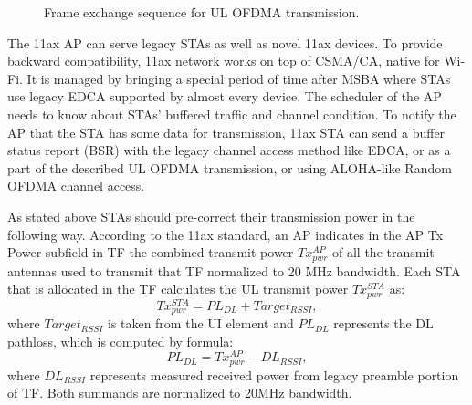 \begin{figure}[t]
{}
	\caption{\label{fig:transmission} Frame exchange sequence for UL OFDMA transmission.}
	\vspace{-0.5em}
\end{figure}

The 11ax AP can serve legacy STAs as well as novel 11ax devices. 
To provide backward compatibility, 11ax network works on top of CSMA/CA, native for Wi-Fi.
It is managed by bringing a special period of time after MSBA where STAs use legacy EDCA supported by almost every device. 
The scheduler of the AP needs to know about STAs' buffered traffic and channel condition.
To notify the AP that the STA has some data for transmission, 11ax STA can send a buffer status report (BSR) with the legacy channel access method like EDCA, or as a part of the described UL OFDMA transmission, or using ALOHA-like Random OFDMA channel access.

As stated above STAs should pre-correct their transmission power in the following way. 
According to the 11ax standard, an AP indicates in the AP Tx Power  subfield in TF the combined transmit power $Tx^{AP}_{pwr}$ of all the transmit antennas used to transmit that TF normalized to 20 MHz bandwidth. 
Each STA that is allocated in the TF calculates the UL transmit power $Tx_{pwr}^{STA}$ as:
\begin{equation}
Tx_{pwr}^{STA} = PL_{DL} + Target_{RSSI},
\end{equation}
where $Target_{RSSI}$ is taken from the UI element and $PL_{DL}$ represents the DL pathloss, which is computed by formula:
\begin{equation}
PL_{DL} = Tx^{AP}_{pwr} - DL_{RSSI},
\end{equation}
where $DL_{RSSI}$ represents measured received power from legacy preamble portion of TF. Both summands are normalized to 20MHz bandwidth. 

